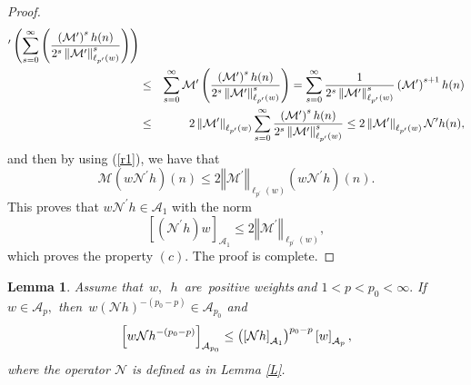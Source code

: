 \documentclass[a4paper]{amsart}
\theoremstyle{plain}
\newtheorem{lemma}{Lemma}[section]
\numberwithin{equation}{section}
\begin{document}
\begin{proof}
\begin{eqnarray*}
^{\prime }\left( \sum_{s=0}^{\infty }\left( \frac{\left( \mathcal{M}^{\prime
}\right) ^{s}h(n)}{2^{s}\left\Vert \mathcal{M}^{\prime }\right\Vert _{\ell
_{p^{\prime }}(w)}^{s}}\right) \right) \\
&\leq &\sum_{s=0}^{\infty }\mathcal{M}^{\prime }\left( \frac{\left( \mathcal{%
M}^{\prime }\right) ^{s}h(n)}{2^{s}\left\Vert \mathcal{M}^{\prime
}\right\Vert _{\ell _{p^{\prime }}(w)}^{s}}\right) =\sum_{s=0}^{\infty }%
\frac{1}{2^{s}\left\Vert \mathcal{M}^{\prime }\right\Vert _{\ell _{p^{\prime
}}(w)}^{s}}\left( \mathcal{M}^{\prime }\right) ^{s+1}h(n) \\
&\leq &2\left\Vert \mathcal{M}^{\prime }\right\Vert _{\ell _{p^{\prime
}}(w)}\sum_{s=0}^{\infty }\frac{\left( \mathcal{M}^{\prime }\right) ^{s}h(n)%
}{2^{s}\left\Vert \mathcal{M}^{\prime }\right\Vert _{\ell _{p^{\prime
}}(w)}^{s}}\leq 2\left\Vert \mathcal{M}^{\prime }\right\Vert _{\ell
_{p^{\prime }}(w)}\mathcal{N}^{\prime }h(n),
\end{eqnarray*}%
and then by using (\ref{r1}), we have that%
\begin{equation*}
\mathcal{M}\left( w\mathcal{N}^{\prime }h\right) (n)\leq 2\left\Vert 
\mathcal{M}^{\prime }\right\Vert _{\ell _{p^{\prime }}(w)}\left( w\mathcal{N}%
^{\prime }h\right) (n).
\end{equation*}%
This proves that $w\mathcal{N}^{\prime }h\in \mathcal{A}_{1}$ with the norm 
\begin{equation*}
\left[ \left( \mathcal{N}^{\prime }h\right) w\right] _{\mathcal{A}_{1}}\leq
2\left\Vert \mathcal{M}^{\prime }\right\Vert _{\ell _{p^{\prime }}(w)},
\end{equation*}%
which proves the property $(c).$ The proof is complete.
\end{proof}

\begin{lemma}
\label{L*}Assume that\ $w,$\ $h$\ are\ positive weights$\ $and $%
1<p<p_{0}<\infty .$ If $w\in \mathcal{A}_{p},$ then\ $w\left( \mathcal{N}%
h\right) ^{-\left( p_{0}-p\right) }\in \mathcal{A}_{p_{0}}$ and 
\begin{equation}
\left[ w\mathcal{N}h^{-\left( p_{0}-p\right) }\right] _{\mathcal{A}%
_{p_{0}}}\leq \left( \left[ \mathcal{N}h\right] _{\mathcal{A}_{1}}\right)
^{p_{0}-p}\left[ w\right] _{\mathcal{A}_{p}},  \notag
\end{equation}%
where the operator $\mathcal{N}$ is defined as in Lemma \ref{L}.
\end{lemma}
\end{document}
